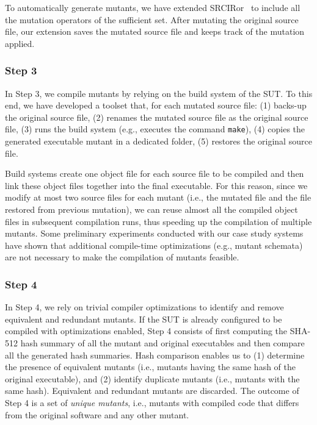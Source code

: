 

To automatically generate mutants, we have extended SRCIRor~\cite{hariri2018srciror} to include all the mutation operators of the sufficient set. After mutating the original source file, our extension saves the mutated source file and keeps track of the mutation applied. 

\subsubsection{Step 3}

In Step 3, we compile mutants by relying on the build system of the SUT. To this end, we have developed a toolset that, for each mutated source file: (1) backs-up the original source file, (2) renames the mutated source file as the original source file, (3) runs the build system (e.g., executes the command \texttt{make}), (4) copies the generated executable mutant in a dedicated folder, (5) restores the original source file. 

Build systems create one object file for each source file to be compiled and then link these object files together into the final executable. For this reason, since we modify at most two source files for each mutant (i.e., the mutated file and the file restored from previous mutation), we can reuse almost all the compiled object files in subsequent compilation runs, thus speeding up the compilation of multiple mutants. Some preliminary experiments conducted with our case study systems have shown that additional compile-time optimizations (e.g., mutant schemata) are not necessary to make the compilation of mutants feasible.

\subsubsection{Step 4}

In Step 4, we rely on trivial compiler optimizations to identify and remove equivalent and redundant mutants. 
If the SUT is already configured to be compiled with optimizations enabled, Step 4 consists of first computing the SHA-512 hash summary of all the mutant and original executables and then compare all the generated hash summaries. Hash comparison enables us to (1) determine the presence of equivalent mutants (i.e., mutants having the same hash of the original executable), and (2) identify duplicate mutants (i.e., mutants with the same hash). %
Equivalent and redundant mutants are discarded.
The outcome of Step 4 is a set of \emph{unique mutants}, i.e., mutants with compiled code that differs from the original software and any other mutant.

